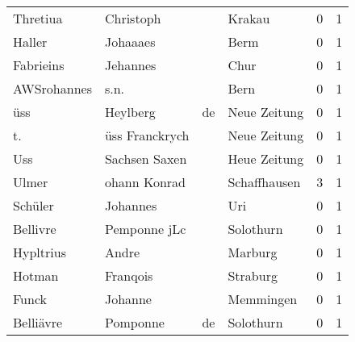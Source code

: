 \begin{tabular}{llllrr}
                 Thretiua &                          Christoph &             &                                      Krakau &          0 &         1 \\
                   Haller &                           Johaaaes &             &                                        Berm &          0 &         1 \\
                Fabrieins &                           Jehannes &             &                                        Chur &          0 &         1 \\
              AWSrohannes &                               s.n. &             &                                        Bern &          0 &         1 \\
                      üss &                           Heylberg &          de &                                Neue Zeitung &          0 &         1 \\
                       t. &                     üss Franckrych &             &                                Neue Zeitung &          0 &         1 \\
                      Uss &                      Sachsen Saxen &             &                                Heue Zeitung &          0 &         1 \\
                    Ulmer &                       ohann Konrad &             &                                Schaffhausen &          3 &         1 \\
                  Schüler &                           Johannes &             &                                         Uri &          0 &         1 \\
                 Bellivre &                       Pemponne jLc &             &                                   Solothurn &          0 &         1 \\
                Hypltrius &                              Andre &             &                                     Marburg &          0 &         1 \\
                   Hotman &                           Franqois &             &                                    Straburg &          0 &         1 \\
                    Funck &                            Johanne &             &                                   Memmingen &          0 &         1 \\
                Belliävre &                           Pomponne &          de &                                   Solothurn &          0 &         1 \\

\end{tabular}
